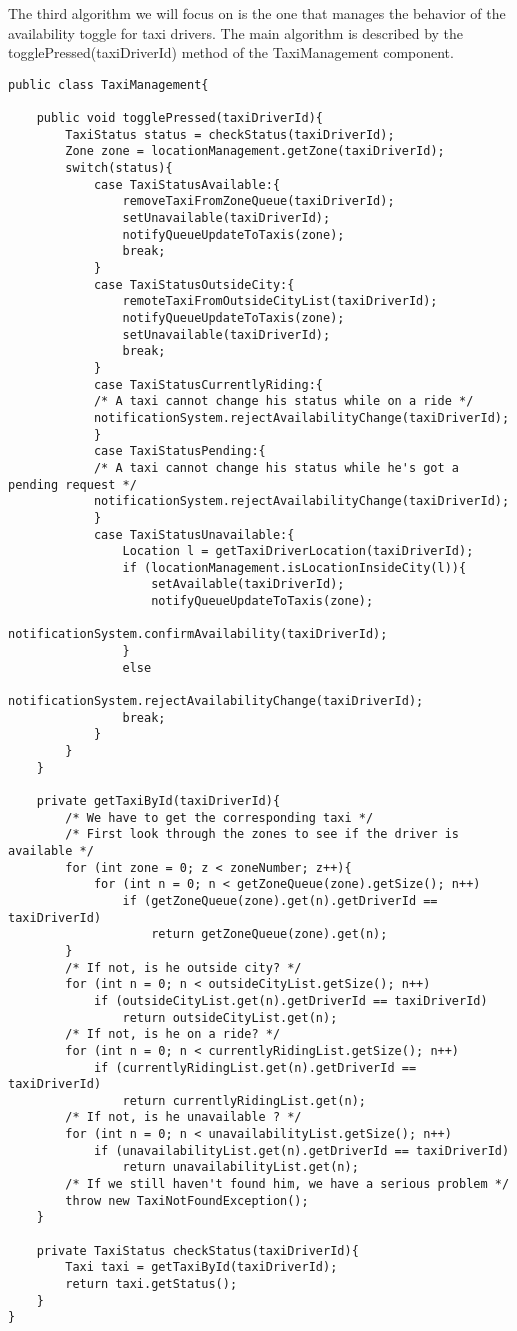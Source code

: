 The third algorithm we will focus on is the one that manages the behavior of the availability toggle for taxi drivers. The main algorithm is described by the togglePressed(taxiDriverId) method of the TaxiManagement component.
\begin{lstlisting}
public class TaxiManagement{

	public void togglePressed(taxiDriverId){
		TaxiStatus status = checkStatus(taxiDriverId);
		Zone zone = locationManagement.getZone(taxiDriverId);
		switch(status){
			case TaxiStatusAvailable:{
				removeTaxiFromZoneQueue(taxiDriverId);
				setUnavailable(taxiDriverId);
				notifyQueueUpdateToTaxis(zone);
				break;
			}
			case TaxiStatusOutsideCity:{
				remoteTaxiFromOutsideCityList(taxiDriverId);
				notifyQueueUpdateToTaxis(zone);
				setUnavailable(taxiDriverId);
				break;
			}
			case TaxiStatusCurrentlyRiding:{
			/* A taxi cannot change his status while on a ride */
			notificationSystem.rejectAvailabilityChange(taxiDriverId);
			}
			case TaxiStatusPending:{
			/* A taxi cannot change his status while he's got a pending request */
			notificationSystem.rejectAvailabilityChange(taxiDriverId);
			}
			case TaxiStatusUnavailable:{
				Location l = getTaxiDriverLocation(taxiDriverId);
				if (locationManagement.isLocationInsideCity(l)){
					setAvailable(taxiDriverId);
					notifyQueueUpdateToTaxis(zone);
					notificationSystem.confirmAvailability(taxiDriverId);
				}
				else 
					notificationSystem.rejectAvailabilityChange(taxiDriverId);
				break;
			}
		}
	}

	private getTaxiById(taxiDriverId){
		/* We have to get the corresponding taxi */
		/* First look through the zones to see if the driver is available */
		for (int zone = 0; z < zoneNumber; z++){
			for (int n = 0; n < getZoneQueue(zone).getSize(); n++)
				if (getZoneQueue(zone).get(n).getDriverId == taxiDriverId)
					return getZoneQueue(zone).get(n);
		}
		/* If not, is he outside city? */
		for (int n = 0; n < outsideCityList.getSize(); n++)
			if (outsideCityList.get(n).getDriverId == taxiDriverId)
				return outsideCityList.get(n);
		/* If not, is he on a ride? */
		for (int n = 0; n < currentlyRidingList.getSize(); n++)
			if (currentlyRidingList.get(n).getDriverId == taxiDriverId)
				return currentlyRidingList.get(n);
		/* If not, is he unavailable ? */
		for (int n = 0; n < unavailabilityList.getSize(); n++)
			if (unavailabilityList.get(n).getDriverId == taxiDriverId)
				return unavailabilityList.get(n);
		/* If we still haven't found him, we have a serious problem */
		throw new TaxiNotFoundException();		
	}

	private TaxiStatus checkStatus(taxiDriverId){
		Taxi taxi = getTaxiById(taxiDriverId);
		return taxi.getStatus();
	}
}
\end{lstlisting}

